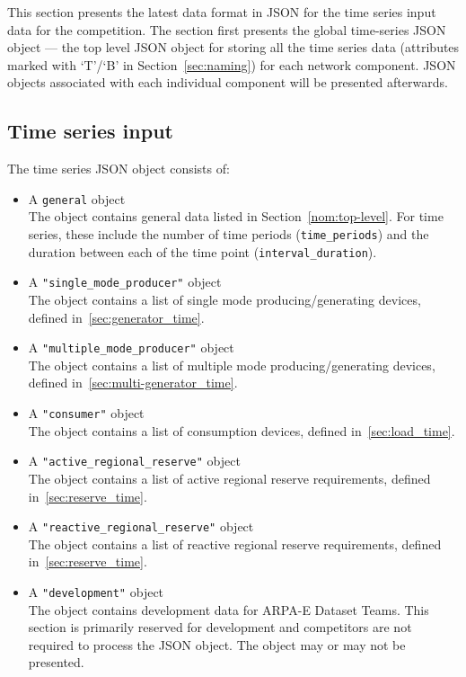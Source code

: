 \label{sec:time_series}
This section presents the latest data format in JSON for the 
time series input data for the competition.
The section first presents the global time-series JSON object --- the
top level JSON object for storing all the time series data 
(attributes marked with `T'/`B' in Section~\ref{sec:naming})
for each network component.
JSON objects associated with each individual component will be presented afterwards.


\subsection{Time series input}
\label{sec:input_data}
The time series JSON object consists of:
\begin{itemize}
    \item A \texttt{general} object\\
    The object contains general data listed
    in Section~\ref{nom:top-level}.
    For time series, these include the number of time periods (\texttt{time\_periods}) and the duration
    between each of the time point (\texttt{interval\_duration}).
    \item A \texttt{"single\_mode\_producer"} object\\
    The object contains a list of single mode producing/generating devices, defined in~\ref{sec:generator_time}.
    \item A \texttt{"multiple\_mode\_producer"} object\\
    The object contains a list of multiple mode producing/generating devices, defined in~\ref{sec:multi-generator_time}.
    \item A \texttt{"consumer"} object\\
    The object contains a list of consumption devices, defined in~\ref{sec:load_time}.
    \item A \texttt{"active\_regional\_reserve"} object\\
    The object contains a list of active regional reserve requirements, defined in~\ref{sec:reserve_time}.
    \item A \texttt{"reactive\_regional\_reserve"} object\\
    The object contains a list of reactive regional reserve requirements, defined in~\ref{sec:reserve_time}.    
    \item A \texttt{"development"} object\\
    The object contains development data for ARPA-E Dataset Teams. This section is primarily reserved for development and competitors are not required to process the JSON object. The object may or may not be presented. 
\end{itemize}

